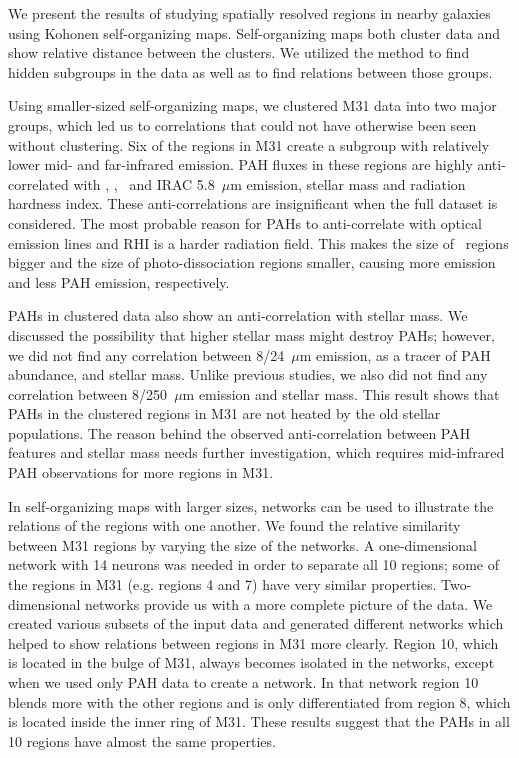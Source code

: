 We present the results of studying spatially resolved regions in nearby galaxies using Kohonen self-organizing maps.
Self-organizing maps both cluster data and show relative distance between the clusters. 
We utilized the method to find hidden subgroups in the data as well as to find relations between those groups.

Using smaller-sized self-organizing maps, we clustered M31 data into two major groups, which led us to correlations that could not have otherwise been seen without clustering.
Six of the regions in M31 create a subgroup with relatively lower mid- and far-infrared emission.
PAH fluxes in these regions are highly anti-correlated with \halphadot, \sii, \oiii~and IRAC 5.8~$\mu$m emission, stellar mass and radiation hardness index.
These anti-correlations are insignificant when the full dataset is considered.
The most probable reason for PAHs to anti-correlate with optical emission lines and RHI is a harder radiation field.
This makes the size of \hii~regions bigger and the size of photo-dissociation regions smaller, causing more \halpha emission and less PAH emission, respectively.

PAHs in clustered data also show an anti-correlation with stellar mass.
We discussed the possibility that higher stellar mass might destroy PAHs;
however, we did not find any correlation between 8/24~$\mu$m emission, as a tracer of PAH abundance, and stellar mass.
Unlike previous studies, we also did not find any correlation between 8/250~$\mu$m emission and stellar mass. 
This result shows that PAHs in the clustered regions in M31 are not heated by the old stellar populations.
The reason behind the observed anti-correlation between PAH features and stellar mass needs further investigation, which requires mid-infrared PAH observations for more regions in M31. 

In self-organizing maps with larger sizes, networks can be used to illustrate the relations of the regions with one another.
We found the relative similarity between M31 regions by varying the size of the networks.
A one-dimensional network with 14 neurons was needed in order to
separate all 10 regions; some of the regions in M31 (e.g. regions 4 and 7) have very similar properties.
Two-dimensional networks provide us with a more complete picture of the data.
We created various subsets of the input data and generated different networks which helped to show relations between regions in M31 more clearly.
Region 10, which is located in the bulge of M31, always becomes isolated in the networks, except when we used only PAH data to create a network.
In that network region 10 blends more with the other regions and is only differentiated from region 8, which is located inside the inner ring of M31.
These results suggest that the PAHs in all 10 regions have almost the same properties.

